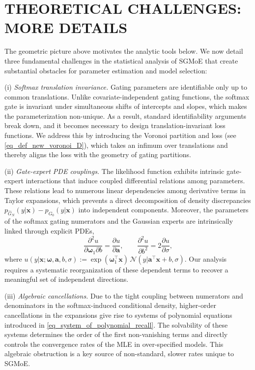 \documentclass[twoside]{article}
\theoremstyle{plain}
\theoremstyle{definition}
\theoremstyle{plain}
\def\vomega{{\bm{\omega}}}
\def\va{{\bm{a}}}
\def\vx{{\bm{x}}}
\newcommand{\cN}{\mathcal{N}}
\begin{document}
\section{THEORETICAL CHALLENGES: MORE DETAILS}\label{sec:appendix:challenges}
The geometric picture above motivates the analytic tools below. We now detail three fundamental challenges in the statistical analysis of SGMoE that create substantial obstacles for parameter estimation and model selection:

(i) \emph{Softmax translation invariance.} Gating parameters are identifiable only up to common translations. Unlike covariate-independent gating functions, the softmax gate is invariant under simultaneous shifts of intercepts and slopes, which makes the parameterization non-unique. As a result, standard identifiability arguments break down, and it becomes necessary to design translation-invariant loss functions. We address this by introducing the Voronoi partition and loss (see \cref{eq_def_new_voronoi_D}), which takes an infimum over translations and thereby aligns the loss with the geometry of gating partitions.

(ii) \emph{Gate-expert PDE couplings.} The likelihood function exhibits intrinsic gate-expert interactions that induce coupled differential relations among parameters. These relations lead to numerous linear dependencies among derivative terms in Taylor expansions, which prevents a direct decomposition of density discrepancies \(p_{\widehat{G}_N} (y|\vx) - p_{G_0} (y|\vx)\) into independent components. Moreover, the parameters of the softmax gating numerators and the Gaussian experts are intrinsically linked through explicit PDEs,
\begin{equation}
    \frac{\partial^2 u}{\partial\vomega_1 \partial b} = \frac{\partial u}{\partial \va}, \qquad \frac{\partial^2 u}{\partial b^2} = 2 \frac{\partial u}{\partial \sigma}, \label{eq_pde}
\end{equation}
where \(u (y | \vx; \vomega, \va, b, \sigma) := \exp (\vomega_1^{\top} \vx)\,\cN (y| \va^{\top} \vx + b, \sigma)\).
Our analysis requires a systematic reorganization of these dependent terms to recover a meaningful set of independent directions.

(iii) \emph{Algebraic cancellations.} Due to the tight coupling between numerators and denominators in the softmax-induced conditional density, higher-order cancellations in the expansions give rise to systems of polynomial equations introduced in \cref{eq_system_of_polynomial_recall}. The solvability of these systems determines the order of the first non-vanishing terms and directly controls the convergence rates of the MLE in over-specified models. This algebraic obstruction is a key source of non-standard, slower rates unique to SGMoE.
\end{document}

